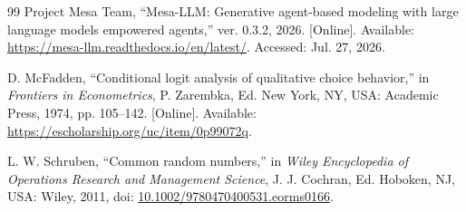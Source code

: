 \documentclass[10pt,a4paper]{article}
\begin{document}
\begin{thebibliography}{99}
Project Mesa Team, ``Mesa-LLM: Generative agent-based modeling with large
language models empowered agents,'' ver. 0.3.2, 2026. [Online]. Available:
\url{https://mesa-llm.readthedocs.io/en/latest/}. Accessed: Jul. 27, 2026.

D. McFadden, ``Conditional logit analysis of qualitative choice behavior,''
in \emph{Frontiers in Econometrics}, P. Zarembka, Ed. New York, NY, USA:
Academic Press, 1974, pp. 105--142. [Online]. Available:
\url{https://escholarship.org/uc/item/0p99072q}.

L. W. Schruben, ``Common random numbers,'' in \emph{Wiley Encyclopedia of
Operations Research and Management Science}, J. J. Cochran, Ed. Hoboken, NJ,
USA: Wiley, 2011, doi:
\href{https://doi.org/10.1002/9780470400531.eorms0166}
{10.1002/9780470400531.eorms0166}.

\end{thebibliography}
\end{document}
